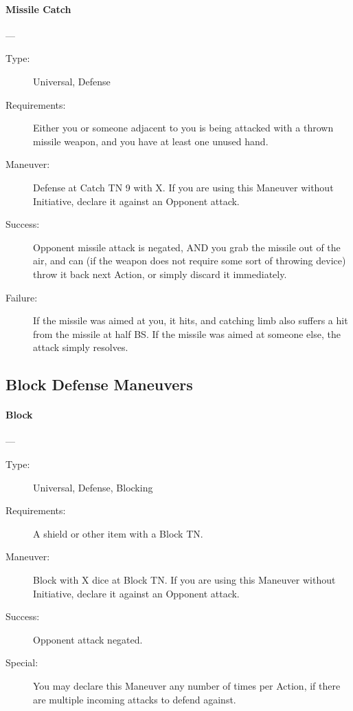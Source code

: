 \documentclass[oneside,11pt,english]{book}
\begin{document}
\paragraph{\large\label{man:Missile Catch}Missile Catch}---\quad{\large[2+X]}
\vspace{-10pt}\begin{description} 
\item [Type:] Universal, Defense 
\item [Requirements:] Either you or someone adjacent to you is being attacked with a thrown missile weapon, 
  and you have at least one unused hand. 
\item [Maneuver:] Defense at Catch TN 9 with X. If you are using this Maneuver without Initiative, declare it 
  against an Opponent attack. 
\item [Success:] Opponent missile attack is negated, AND you grab the missile out of the air, and can (if the 
  weapon does not require some sort of throwing device) throw it back next Action, or simply discard it 
  immediately. 
\item [Failure:] If the missile was aimed at you, it hits, and catching limb also suffers a hit from the missile at 
  half BS. If the missile was aimed at someone else, the attack simply resolves. 
\end{description}
\subsection{Block Defense Maneuvers}
\paragraph{\large\label{man:Block}Block}---\quad{\large[X]}
\vspace{-10pt}\begin{description} 
\item [Type:] Universal, Defense, Blocking 
\item [Requirements:] A shield or other item with a Block TN. 
\item [Maneuver:] Block with X dice at Block TN. If you are using this Maneuver without Initiative, declare it 
  against an Opponent attack. 
\item [Success:] Opponent attack negated. 
\item [Special:] You may declare this Maneuver any number of times per Action, if there are multiple incoming 
  attacks to defend against. 
\end{description}
\end{document}
